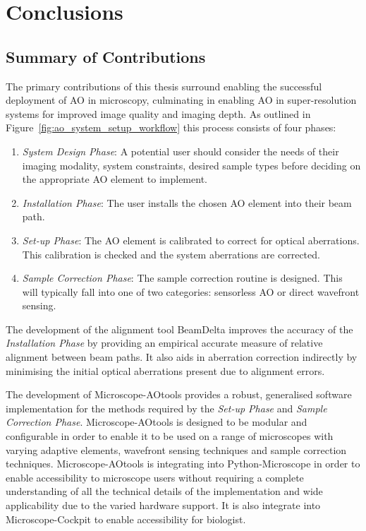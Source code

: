 \chapter{Conclusions}
\label{chpt:conclusions}

\section{Summary of Contributions}
\label{sec:contributions}

The primary contributions of this thesis surround enabling the successful 
deployment of AO in microscopy, culminating in enabling AO in 
super-resolution systems for improved image quality and imaging depth. As 
outlined in Figure~\ref{fig:ao_system_setup_workflow} this process consists 
of four phases:

\begin{enumerate}
	\item \textit{System Design Phase}: A potential user should consider 
	the needs of their imaging modality, system constraints, desired 
	sample types before deciding on the appropriate AO element to 
	implement.
	\item \textit{Installation Phase}: The user installs the chosen AO 
	element into their beam path.
	\item \textit{Set-up Phase}: The AO element is calibrated to correct 
	for optical aberrations. This calibration is checked and the system 
	aberrations are corrected.
	\item \textit{Sample Correction Phase}: The sample correction routine 
	is designed. This will typically fall into one of two categories: 
	sensorless AO or direct wavefront sensing.
\end{enumerate}  

The development of the alignment tool BeamDelta improves the accuracy of the 
\textit{Installation Phase} by providing an empirical accurate measure of 
relative alignment between beam paths\cite{dobbie2019beamdelta}. It also aids 
in aberration correction indirectly by minimising the initial optical 
aberrations present due to alignment errors.

The development of Microscope-AOtools provides a robust, generalised 
software implementation for the methods required by the \textit{Set-up Phase} 
and \textit{Sample Correction Phase}\cite{hall2020microscope}. 
Microscope-AOtools is designed to be modular and configurable in order to 
enable it to be used on a range of microscopes with varying adaptive 
elements, wavefront sensing techniques and sample correction techniques. 
Microscope-AOtools is integrating into Python-Microscope in order to enable 
accessibility to microscope users without requiring a complete understanding 
of all the technical details of the implementation and wide
applicability due to the varied hardware support. It is also integrate into 
Microscope-Cockpit to enable accessibility for biologist.

